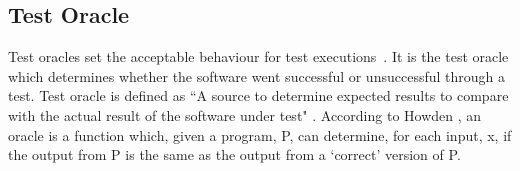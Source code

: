 





\subsection{Test Oracle}
Test oracles set the acceptable behaviour for test executions~\cite{baresi2001test}. It is the test oracle which determines whether the software went successful or unsuccessful through a test. Test oracle is defined as ``A source to determine expected results to compare with the actual result of the software under test" \cite{ahmed2010software}. According to Howden \cite{howden1986}, an oracle is a function which, given a program, P, can determine, for each input, x, if the output from P is the same as the output from a ‘correct’ version of P.

